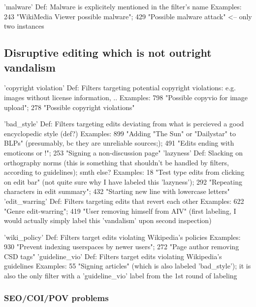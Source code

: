 'malware'
  Def: Malware is explicitely mentioned in the filter's name
  Examples: 243 "WikiMedia Viewer possible malware"; 429 "Possible malware attack" <-- only two instances


\subsection{Disruptive editing which is not outright vandalism}

'copyright violation'
  Def: Filters targeting potential copyright violations: e.g. images without license information, ..
  Examples: 798 "Possible copyvio for image upload"; 278 "Possible copyright violations"

'bad\_style'
  Def: Filters targeting edits deviating from what is percieved a good encyclopedic style (def?)
  Examples: 899 "Adding "The Sun" or "Dailystar" to BLPs" (presumably, bc they are unreliable sources;); 491 "Edits ending with emoticons or !"; 253 "Signing a non-discussion page"
'lazyness'
  Def: Slacking on orthography norms (this is something that shouldn't be handled by filters, according to guidelines); smth else?
  Examples: 18 "Test type edits from clicking on edit bar" (not quite sure why I have labeled this 'lazyness'); 292 "Repeating characters in edit summary"; 432 "Starting new line with lowercase letters"
'edit\_warring'
  Def: Filters targeting edits that revert each other
  Examples: 622 "Genre edit-warring"; 419 "User removing himself from AIV" (first labeling, I would actually simply label this 'vandalism' upon second inspection)

'wiki\_policy'
  Def: Filters target edits violating Wikipedia's policies
  Examples: 930 "Prevent indexing userspaces by newer users"; 272 "Page author removing CSD tags"
'guideline\_vio'
  Def: Filters target edits violating Wikipedia's guidelines %
  Examples: 55 "Signing articles" (which is also labeled 'bad\_style'); it is also the only filter with a 'guideline\_vio' label from the 1st round of labeling

\subsubsection{SEO/COI/POV problems}

